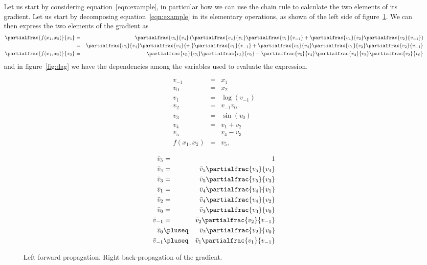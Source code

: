 \documentclass{article}
\begin{document}
Let us start by considering equation~\ref{eqn:example}, in particular how we can
use the chain rule to calculate the two elements of its gradient. Let us start
by decomposing equation~\ref{eqn:example} in its elementary operations, as
shown of the left side of figure~\ref{fig:example}. We can then express the two
elements of the gradient as
\begin{eqnarray*}
\partialfrac{f(x_1,x_2)}{x_1}
&=& \partialfrac{v_5}{v_4}\left(\partialfrac{v_4}{v_1}\partialfrac{v_1}{v_{-1}}
	+ \partialfrac{v_4}{v_2}\partialfrac{v_2}{v_{-1}}\right) \\
&=& \partialfrac{v_5}{v_4}\partialfrac{v_4}{v_1}\partialfrac{v_1}{v_{-1}}
	+ \partialfrac{v_5}{v_4}\partialfrac{v_4}{v_2}\partialfrac{v_2}{v_{-1}} \\
\partialfrac{f(x_1,x_2)}{x_2}
&=& \partialfrac{v_5}{v_3}\partialfrac{v_3}{v_0}
	+ \partialfrac{v_5}{v_4}\partialfrac{v_4}{v_2}\partialfrac{v_2}{v_0}
\end{eqnarray*}
and in figure~\ref{fig:dag} we have the dependencies among the variables used
to evaluate the expression.

\begin{figure}
\begin{minipage}{.5\textwidth}
\begin{eqnarray*}
v_{-1} &=& x_1 \\
v_0 &=& x_2 \\
v_1 &=& \log(v_{-1}) \\
v_2 &=& v_{-1}v_0 \\
v_3 &=& \sin(v_0) \\
v_4 &=& v_1+v_2 \\
v_5 &=& v_4-v_3 \\
f(x_1,x_2) &=& v_5,
\end{eqnarray*}
\end{minipage}
\begin{minipage}{.5\textwidth}
\makepartialfractextstyle
\begin{eqnarray*}
\bar v_5 &=& 1 \\
\bar v_4 &=& \bar v_5 \partialfrac{v_5}{v_4} \\
\bar v_3 &=& \bar v_5 \partialfrac{v_5}{v_3} \\
\bar v_1 &=& \bar v_4 \partialfrac{v_4}{v_1} \\
\bar v_2 &=& \bar v_4 \partialfrac{v_4}{v_2} \\
\bar v_0 &=& \bar v_3 \partialfrac{v_3}{v_0} \\
\bar v_{-1} &=& \bar v_2 \partialfrac{v_2}{v_{-1}} \\
\bar v_0 &\pluseq& \bar v_2 \partialfrac{v_2}{v_0} \\
\bar v_{-1} &\pluseq& \bar v_1 \partialfrac{v_1}{v_{-1}}
\end{eqnarray*}
\end{minipage}
\caption{Left forward propagation. Right back-propagation of the gradient.}
\label{fig:example}
\end{figure}
\end{document}
